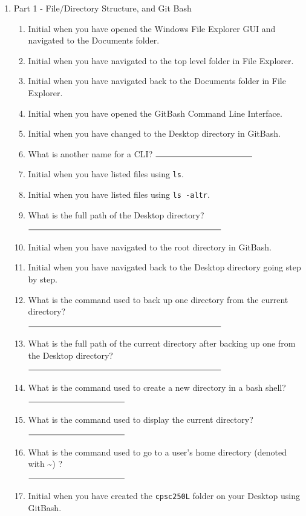 \documentclass[notitlepage,12pt]{../../cpsc250l}
\begin{document}
\begin{enumerate}
\item Part 1 - File/Directory Structure, and Git Bash
	\begin{enumerate}
	\item \initial Initial when you have opened the Windows File Explorer GUI and navigated to the Documents folder.
	\item \initial Initial when you have navigated to the top level folder in File Explorer.
	\item \initial Initial when you have navigated back to the Documents folder in File Explorer.
	\item \initial Initial when you have opened the GitBash Command Line Interface.
	\item \initial Initial when you have changed to the Desktop directory in GitBash.
	\item What is another name for a CLI?  $\rule{4cm}{0.15mm}$
	\item \initial Initial when you have listed files using \texttt{ls}.
	\item \initial Initial when you have listed files using \texttt{ls -altr}.
	\item What is the full path of the Desktop directory?\\ $\rule{8cm}{0.15mm}$
	\item \initial Initial when you have navigated to the root directory in GitBash.
	\item \initial Initial when you have navigated back to the Desktop directory going step by step.
	\item What is the command used to back up one directory from the current directory?\\
	$\rule{8cm}{0.15mm}$
	\item What is the full path of the current directory after backing up one from the Desktop directory?\\ $\rule{8cm}{0.15mm}$
	\item What is the command used to create a new directory in a bash shell?\\
	$\rule{4cm}{0.15mm}$
	\item What is the command used to display the current directory?\\
	$\rule{4cm}{0.15mm}$
	\item What is the command used to go to a user's home directory (denoted with \textasciitilde) ?\\
	$\rule{4cm}{0.15mm}$
	\item \initial Initial when you have created the \texttt{cpsc250L} folder on your Desktop using GitBash.

\end{enumerate}
\end{enumerate}
\end{document}
